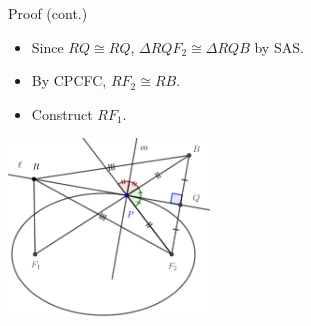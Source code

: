 \documentclass[compress,aspectratio=169,10pt,usenames,dvipsnames]{beamer}
\begin{document}

\begin{frame}

\vfill

\begin{block}{Proof (cont.)}
\begin{itemize}
\item Since $RQ \cong RQ$, $\Delta RQF_2 \cong \Delta RQB$ by SAS.  
\item By CPCFC, $RF_2 \cong RB$. 
\item Construct $R F_1$. 
\end{itemize}
\end{block}

\begin{center}
\includegraphics[width=0.4\textwidth]{EllipseProp1D}
\end{center}

\vfill

\end{frame}

\end{document}

